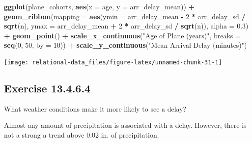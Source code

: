 \documentclass[]{book}
\newenvironment{Shaded}{\begin{snugshade}}{\end{snugshade}}
\newcommand{\DataTypeTok}[1]{\textcolor[rgb]{0.13,0.29,0.53}{#1}}
\newcommand{\DecValTok}[1]{\textcolor[rgb]{0.00,0.00,0.81}{#1}}
\newcommand{\FloatTok}[1]{\textcolor[rgb]{0.00,0.00,0.81}{#1}}
\newcommand{\KeywordTok}[1]{\textcolor[rgb]{0.13,0.29,0.53}{\textbf{#1}}}
\newcommand{\NormalTok}[1]{#1}
\newcommand{\OperatorTok}[1]{\textcolor[rgb]{0.81,0.36,0.00}{\textbf{#1}}}
\newcommand{\StringTok}[1]{\textcolor[rgb]{0.31,0.60,0.02}{#1}}
\theoremstyle{plain}
\theoremstyle{remark}
\begin{document}
\begin{Shaded}
\begin{Highlighting}[]
\KeywordTok{ggplot}\NormalTok{(plane_cohorts, }\KeywordTok{aes}\NormalTok{(}\DataTypeTok{x =}\NormalTok{ age, }\DataTypeTok{y =}\NormalTok{ arr_delay_mean)) }\OperatorTok{+}
\StringTok{  }\KeywordTok{geom_ribbon}\NormalTok{(}\DataTypeTok{mapping =} \KeywordTok{aes}\NormalTok{(}\DataTypeTok{ymin =}\NormalTok{ arr_delay_mean }\OperatorTok{-}\StringTok{ }
\StringTok{                              }\DecValTok{2} \OperatorTok{*}\StringTok{ }\NormalTok{arr_delay_sd }\OperatorTok{/}\StringTok{ }\KeywordTok{sqrt}\NormalTok{(n), }
                            \DataTypeTok{ymax =}\NormalTok{ arr_delay_mean }\OperatorTok{+}\StringTok{ }
\StringTok{                              }\DecValTok{2} \OperatorTok{*}\StringTok{ }\NormalTok{arr_delay_sd }\OperatorTok{/}\StringTok{ }\KeywordTok{sqrt}\NormalTok{(n)),}
              \DataTypeTok{alpha =} \FloatTok{0.3}\NormalTok{) }\OperatorTok{+}
\StringTok{  }\KeywordTok{geom_point}\NormalTok{() }\OperatorTok{+}
\StringTok{  }\KeywordTok{scale_x_continuous}\NormalTok{(}\StringTok{"Age of Plane (years)"}\NormalTok{, }\DataTypeTok{breaks =} \KeywordTok{seq}\NormalTok{(}\DecValTok{0}\NormalTok{, }\DecValTok{50}\NormalTok{, }\DataTypeTok{by =} \DecValTok{10}\NormalTok{)) }\OperatorTok{+}
\StringTok{  }\KeywordTok{scale_y_continuous}\NormalTok{(}\StringTok{"Mean Arrival Delay (minutes)"}\NormalTok{)}
\end{Highlighting}
\end{Shaded}

\begin{center}\texttt{[image: relational-data\_files/figure-latex/unnamed-chunk-31-1]} \end{center}

\hypertarget{exercise-13.4.6.4}{%
\subsection*{\texorpdfstring{Exercise {13.4.6.4}}{Exercise 13.4.6.4}}\label{exercise-13.4.6.4}}

What weather conditions make it more likely to see a delay?

Almost any amount of precipitation is associated with a delay.
However, there is not a strong a trend above 0.02 in. of precipitation.
\end{document}
